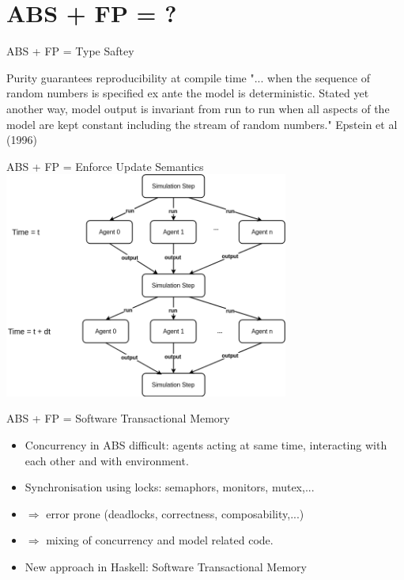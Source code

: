 \documentclass{beamer}
\begin{document}
\section{ABS + FP = ?}
\begin{frame}{ABS + FP = Type Saftey}
	\begin{block}{Purity guarantees reproducibility at compile time}
    "... when the sequence of random numbers is specified ex ante the model is deterministic. Stated yet another way, model output is invariant from run to run when all aspects of the model are kept constant including the stream of random numbers." Epstein et al (1996)
    \end{block}
\end{frame}

\begin{frame}{ABS + FP = Enforce Update Semantics}
  \includegraphics[width=0.7\textwidth]{./fig/parallel_strategy.png}
\end{frame}

\begin{frame}{ABS + FP = Software Transactional Memory}
  \begin{itemize}
  	\item Concurrency in ABS difficult: agents acting at same time, interacting with each other and with environment.
	\item Synchronisation using locks: semaphors, monitors, mutex,...  	
  	\item $\Rightarrow$ error prone (deadlocks, correctness, composability,...)
  	\item $\Rightarrow$ mixing of concurrency and model related code.
  	\item New approach in Haskell: Software Transactional Memory
  \end{itemize}
\end{frame}
\end{document}
